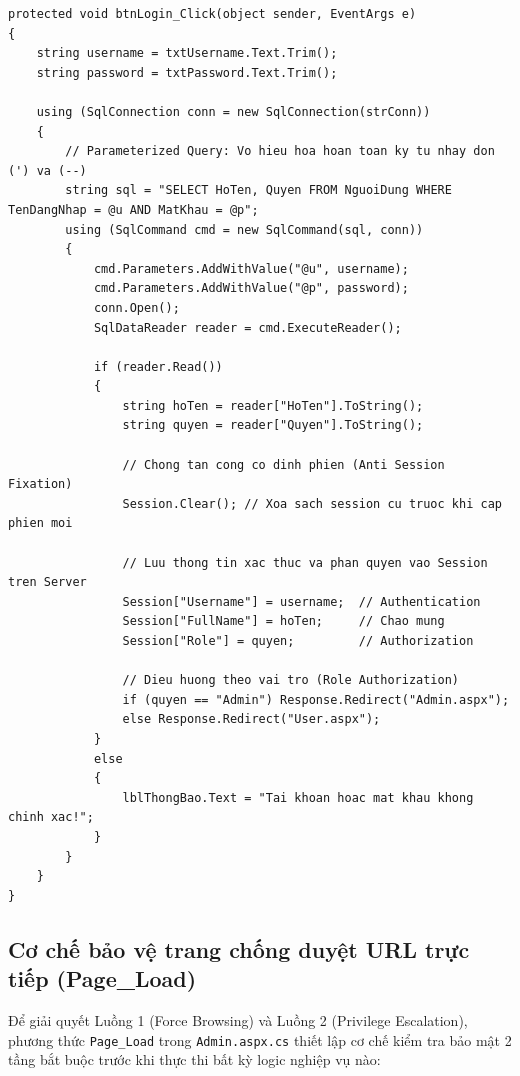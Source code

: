 \documentclass[12pt,a4paper]{report}
\begin{document}
\begin{minipage}{\linewidth}
\begin{lstlisting}[language={[Sharp]C}, caption={Xử lý đăng nhập bằng Parameterized Query và lưu Session}]
protected void btnLogin_Click(object sender, EventArgs e)
{
    string username = txtUsername.Text.Trim();
    string password = txtPassword.Text.Trim();

    using (SqlConnection conn = new SqlConnection(strConn))
    {
        // Parameterized Query: Vo hieu hoa hoan toan ky tu nhay don (') va (--)
        string sql = "SELECT HoTen, Quyen FROM NguoiDung WHERE TenDangNhap = @u AND MatKhau = @p";
        using (SqlCommand cmd = new SqlCommand(sql, conn))
        {
            cmd.Parameters.AddWithValue("@u", username);
            cmd.Parameters.AddWithValue("@p", password);
            conn.Open();
            SqlDataReader reader = cmd.ExecuteReader();

            if (reader.Read())
            {
                string hoTen = reader["HoTen"].ToString();
                string quyen = reader["Quyen"].ToString();

                // Chong tan cong co dinh phien (Anti Session Fixation)
                Session.Clear(); // Xoa sach session cu truoc khi cap phien moi

                // Luu thong tin xac thuc va phan quyen vao Session tren Server
                Session["Username"] = username;  // Authentication
                Session["FullName"] = hoTen;     // Chao mung
                Session["Role"] = quyen;         // Authorization

                // Dieu huong theo vai tro (Role Authorization)
                if (quyen == "Admin") Response.Redirect("Admin.aspx");
                else Response.Redirect("User.aspx");
            }
            else
            {
                lblThongBao.Text = "Tai khoan hoac mat khau khong chinh xac!";
            }
        }
    }
}
\end{lstlisting}
\end{minipage}

\newpage
\subsection{Cơ chế bảo vệ trang chống duyệt URL trực tiếp (Page\_Load)}
Để giải quyết Luồng 1 (Force Browsing) và Luồng 2 (Privilege Escalation), phương thức \texttt{Page\_Load} trong \texttt{Admin.aspx.cs} thiết lập cơ chế kiểm tra bảo mật 2 tầng bắt buộc trước khi thực thi bất kỳ logic nghiệp vụ nào:
\end{document}

